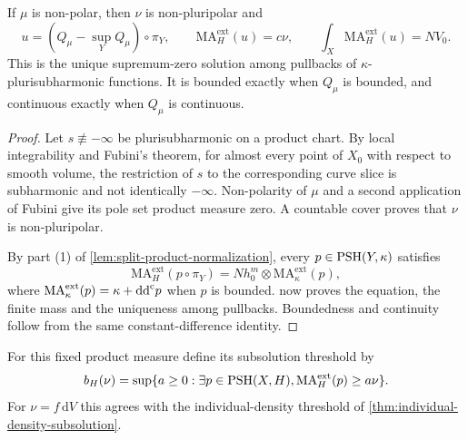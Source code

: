\begin{proposition}\label{prop:nonpolar-curve-product-equation}
If $\mu$ is non-polar, then $\nu$ is non-pluripolar and
\[
 u=(Q_\mu-\sup_YQ_\mu)\circ\pi_Y,\qquad
 \mathrm{MA}^{\mathrm{ext}}_H(u)=c\nu,\qquad
 \int_X\mathrm{MA}^{\mathrm{ext}}_H(u)=NV_0.
\]
This is the unique supremum-zero solution among pullbacks of $\kappa$-plurisubharmonic functions. It is bounded exactly when $Q_\mu$ is bounded, and continuous exactly when $Q_\mu$ is continuous.
\end{proposition}
\begin{proof}
Let $s\not\equiv-\infty$ be plurisubharmonic on a product chart. By local integrability and Fubini's theorem, for almost every point of $X_0$ with respect to smooth volume, the restriction of $s$ to the corresponding curve slice is subharmonic and not identically $-\infty$. Non-polarity of $\mu$ and a second application of Fubini give its pole set product measure zero. A countable cover proves that $\nu$ is non-pluripolar.

By part (1) of \cref{lem:split-product-normalization}, every $p\in\mathrm{PSH}(Y,\kappa)$ satisfies
\begin{equation}\label{eq:singular-curve-product-identity}
 \mathrm{MA}^{\mathrm{ext}}_H(p\circ\pi_Y)
 =N h_0^m\otimes\mathrm{MA}^{\mathrm{ext}}_\kappa(p),
\end{equation}
where $\mathrm{MA}^{\mathrm{ext}}_\kappa(p)=\kappa+\mathrm{dd}^{\mathrm{c}} p$ when $p$ is bounded.  now proves the equation, the finite mass and the uniqueness among pullbacks. Boundedness and continuity follow from the same constant-difference identity.
\end{proof}

For this fixed product measure define its subsolution threshold by
\[
 b_H(\nu)=\sup\{a\geq0:\exists p\in\mathrm{PSH}(X,H),
                \mathrm{MA}^{\mathrm{ext}}_H(p)\geq a\nu\}.
\]
For $\nu=f\,\mathrm dV$ this agrees with the individual-density threshold of \cref{thm:individual-density-subsolution}.

